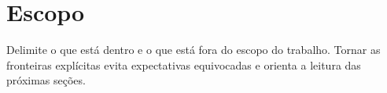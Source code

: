 \section{Escopo}

Delimite o que está dentro e o que está fora do escopo do trabalho. Tornar as
fronteiras explícitas evita expectativas equivocadas e orienta a leitura das
próximas seções.
